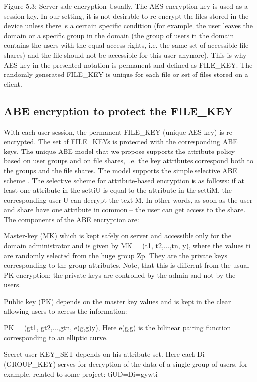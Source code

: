 \documentclass[twocolumn]{svjour3}          %
\begin{document}
Figure 5.3: Server-side encryption
Usually, The AES encryption key is used as a session key. In our setting, it is not desirable to re-encrypt the files stored in the device unless there is a certain specific condition (for example, the user leaves the domain or a specific group in the domain (the group of users in the domain contains the users with the equal access rights, i.e. the same set of accessible file shares) and the file should not be accessible for this user anymore). This is why AES key in the presented notation is permanent and defined as FILE\_KEY. The randomly generated FILE\_KEY is unique for each file or set of files stored on a client. 

\subsection{ABE encryption to protect the FILE\_KEY }
\label{sec_abe}
With each user session, the permanent FILE\_KEY (unique AES key) is re-encrypted. The set of FILE\_KEYs is protected with the corresponding ABE keys. The unique ABE model that we propose supports the attribute policy based on user groups and on file shares, i.e. the key attributes correspond both to the groups and the file shares.
The model supports the simple selective ABE scheme \cite{galibus2015cloud,galibus2014}. The selective scheme for attribute-based encryption is as follows: if at least one attribute in the set{ti}U is equal to the attribute in the set{ti}M, the corresponding user U can decrypt the text M. In other words, as soon as the user and share have one attribute in common – the user can get access to the share. The components of the ABE encryption are:

Master-key (MK) which is kept safely on server and accessible only for the domain administrator and is given by
MK = (t1, t2,...,tn, y),
where the values ti are randomly selected from the huge group Zp. They are the private keys corresponding to the group attributes. Note, that this is different from the usual PK encryption: the private keys are controlled by the admin and not by the users.

Public key (PK) depends on the master key values and is kept in the clear allowing users to access the information:

PK = (gt1, gt2,...,gtn, e(g,g)y),
Here e(g,g) is the bilinear pairing function corresponding to an elliptic curve.

Secret user KEY\_SET depends on his attribute set. Here each Di (GROUP\_KEY) serves for decryption of the data of a single group of users, for example, related to some project:
{ti}UD={Di=gywti}
\end{document}
